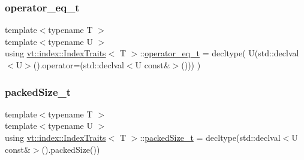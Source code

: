 \mbox{\label{structvt_1_1index_1_1_index_traits_a23832f22385d2d20bb1fc9885aef6146}} 
\subsubsection{\texorpdfstring{operator\+\_\+eq\+\_\+t}{operator\_eq\_t}}
{\footnotesize\ttfamily template$<$typename T $>$ \\
template$<$typename U $>$ \\
using \hyperlink{structvt_1_1index_1_1_index_traits}{vt\+::index\+::\+Index\+Traits}$<$ T $>$\+::\hyperlink{structvt_1_1index_1_1_index_traits_a23832f22385d2d20bb1fc9885aef6146}{operator\+\_\+eq\+\_\+t} =  decltype( U(std\+::declval$<$U$>$().operator=(std\+::declval$<$U const\&$>$())) )}

\mbox{\label{structvt_1_1index_1_1_index_traits_a6d511f10a88cd9fb5b4d832127ce5044}} 
\subsubsection{\texorpdfstring{packed\+Size\+\_\+t}{packedSize\_t}}
{\footnotesize\ttfamily template$<$typename T $>$ \\
template$<$typename U $>$ \\
using \hyperlink{structvt_1_1index_1_1_index_traits}{vt\+::index\+::\+Index\+Traits}$<$ T $>$\+::\hyperlink{structvt_1_1index_1_1_index_traits_a6d511f10a88cd9fb5b4d832127ce5044}{packed\+Size\+\_\+t} =  decltype(std\+::declval$<$U const\&$>$().packed\+Size())}

\mbox{\label{structvt_1_1index_1_1_index_traits_afd3d724feb07329acc70afc067320558}} 

